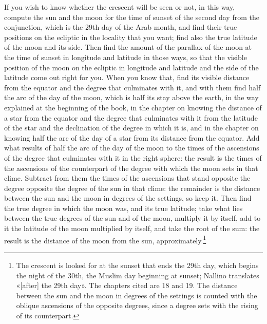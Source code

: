 \documentclass[11pt]{article}
\newcommand{\ArPage}[1]{\marginpar{\footnotesize\color{gray}Ar.\,p.\,#1}}
\begin{document}
\par \ArPage{131}If you wish to know whether the crescent will be seen or not, in this way, compute the sun and the moon for the time of sunset of the second day from the conjunction, which is the 29th day of the Arab month, and find their true positions on the ecliptic in the locality that you want; find also the true latitude of the moon and its side. Then find the amount of the parallax of the moon at the time of sunset in longitude and latitude in those ways, so that the visible position of the moon on the ecliptic in longitude and latitude and the side of the latitude come out right for you. When you know that, find its visible distance from the equator and the degree that culminates with it, and with them find half the arc of the day of the moon, which is half its stay above the earth, in the way explained at the beginning of the book, in the chapter on knowing the distance of a star from the equator and the degree that culminates with it from the latitude of the star and the declination of the degree in which it is, and in the chapter on knowing half the arc of the day of a star from its distance from the equator. Add what results of half the arc of the day of the moon to the times of the ascensions of the degree that culminates with it in the right sphere: the result is the times of the ascensions of the counterpart of the degree with which the moon sets in that clime. Subtract from them the times of the ascensions that stand opposite the degree opposite the degree of the sun in that clime: the remainder is the distance between the sun and the moon in degrees of the settings, so keep it. Then find the true degree in which the moon was, and its true latitude; take what lies between the true degrees of the sun and of the moon, multiply it by itself, add to it the latitude of the moon multiplied by itself, and take the root of the sum: the result is the distance of the moon from the sun, approximately.\footnote{The crescent is looked for at the sunset that ends the 29th day, which begins the night of the 30th, the Muslim day beginning at sunset; Nallino translates «[after] the 29th day». The chapters cited are 18 and 19. The distance between the sun and the moon in degrees of the settings is counted with the oblique ascensions of the opposite degrees, since a degree sets with the rising of its counterpart.}\par
\end{document}
